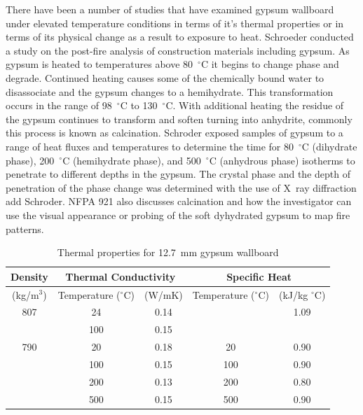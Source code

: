 \documentclass[twoside]{uocthesis}
\begin{document}
There have been a number of studies that have examined gypsum wallboard under elevated temperature conditions in terms of it's thermal properties or in terms of its physical change as a result to exposure to heat.  Schroeder conducted a study on the post-fire analysis of construction materials including gypsum.  As gypsum is heated to temperatures above 80~$^\circ$C it begins to change phase and degrade.  Continued heating causes some of the chemically bound water to disassociate and the gypsum changes to a hemihydrate.  This transformation occurs in the range of 98~$^\circ$C to 130~$^\circ$C. With additional heating the residue of the gypsum continues to transform and soften turning into anhydrite, commonly this process is known as calcination.  Schroder exposed samples of gypsum to a range of heat fluxes and temperatures to determine the time for 80~$^\circ$C (dihydrate phase), 200~$^\circ$C (hemihydrate phase), and 500~$^\circ$C (anhydrous phase) isotherms to penetrate to different depths in the gypsum.  The crystal phase and the depth of penetration of the phase change was determined with the use of X~\-ray diffraction  add Schroder.  NFPA 921 also discusses calcination and how the investigator can use the visual appearance or probing of the soft dyhydrated gypsum to map fire patterns.

\begin{table}
	\centering
	\begin{tabular}{|c|c|c|c|c|}
		\hline Density & \multicolumn{2}{c|}{Thermal Conductivity}   & \multicolumn{2}{c|}{Specific Heat}  \\
		\hline (kg/m$^3$) & Temperature ($^{\circ}$C) & (W/mK)  & Temperature ($^{\circ}$C)  & (kJ/kg $^{\circ}$C) \\ \hline
		\hline 807  & 24 	& 0.14 	&  		& 1.09 \\
		\hline  	& 100 	& 0.15  &  		&  \\
		\hline 790 	& 20 	& 0.18	& 20 	& 0.90 \\
		\hline  	& 100 	& 0.15 	& 100 	& 0.90 \\
		\hline  	& 200 	& 0.13 	& 200 	& 0.80 \\
		\hline  	& 500 	& 0.15 	& 500	& 0.90 \\
		\hline
		\end{tabular}
		\caption[Thermal properties for 12.7~mm gypsum wallboard]{Thermal properties for 12.7~mm gypsum wallboard}
		\label{tab:Gypsum wallboard_Thermal_Properties}
		\end{table}
\end{document}
